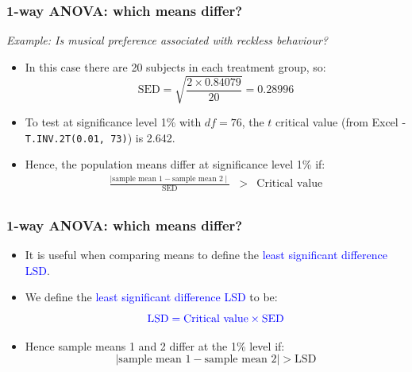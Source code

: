 \documentclass[12pt,xcolor=dvipsnames,handout,mathserif,aspectratio=169]{beamer}
\newcommand{\tc}{\textcolor}
\begin{document}
\begin{frame}
\frametitle{1-way ANOVA: which means differ?}
\emph{Example: Is musical preference associated with reckless behaviour?}
\begin{itemize}
\item In this case there are 20 subjects in each treatment group, so:
$$\mbox{SED} = \sqrt{\frac{2 \times 0.84079}{20}} = 0.28996$$
\item To test at significance level 1\% with $df = 76$, the $t$ critical value (from Excel - \texttt{T.INV.2T(0.01, 73)}) is 2.642.
\item Hence, the population means differ at significance level 1\% if:
\begin{eqnarray*}
\frac{\mid\mbox{sample mean 1} - \mbox{sample mean 2} \mid}{\mbox{SED}} &>& \mbox{Critical value}\\
\end{eqnarray*}
\end{itemize}
\end{frame}

\begin{frame}
\frametitle{1-way ANOVA: which means differ?}
\begin{itemize}
\item It is useful when comparing means to define the \tc{blue}{least significant difference LSD}.
\vspace{0.3cm}
\item We define the \tc{blue}{least significant difference LSD} to be:
$$\tc{blue}{\mbox{LSD} = \mbox{Critical value} \times  \mbox{SED}}$$
\item Hence sample means 1 and 2 differ at the 1\% level if:
$$\mid\mbox{sample mean 1} - \mbox{sample mean 2} \mid >  \mbox{LSD}$$
\end{itemize}
\end{frame}
\end{document}
